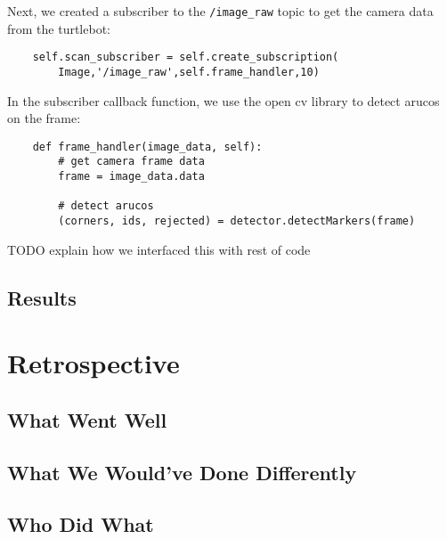 \documentclass{article}
\begin{document}
Next, we created a subscriber to the \verb|/image_raw| topic to get the camera data from the turtlebot:

\begin{lstlisting}
    self.scan_subscriber = self.create_subscription(
        Image,'/image_raw',self.frame_handler,10)
\end{lstlisting}

In the subscriber callback function, we use the open cv library to detect arucos on the frame:

\begin{lstlisting}
    def frame_handler(image_data, self):
        # get camera frame data
        frame = image_data.data

        # detect arucos
        (corners, ids, rejected) = detector.detectMarkers(frame)
\end{lstlisting}

TODO explain how we interfaced this with rest of code

\subsection{Results}

\section{Retrospective}

\subsection{What Went Well}

\subsection{What We Would've Done Differently}

\subsection{Who Did What}
\end{document}

